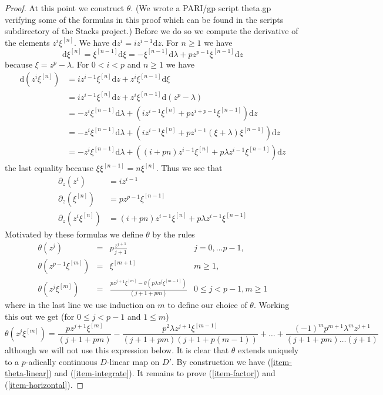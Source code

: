 \documentclass{amsart}
\theoremstyle{plain}
\theoremstyle{definition}
\theoremstyle{remark}
\numberwithin{equation}{subsection}
\begin{document}
\begin{proof}
\medskip\noindent
At this point we construct $\theta$. (We wrote a PARI/gp script theta.gp
verifying some of the formulas in this proof which can be found in the
scripts subdirectory of the Stacks project.) Before we do so we compute
the derivative of the elements $z^i \xi^{[n]}$. We have
$\text{d}z^i = i z^{i - 1} \text{d}z$. For $n \geq 1$ we have
$$
\text{d}\xi^{[n]} =
\xi^{[n - 1]} \text{d}\xi =
- \xi^{[n - 1]}\text{d}\lambda + p z^{p - 1} \xi^{[n - 1]}\text{d}z
$$
because $\xi = z^p - \lambda$. For $0 < i < p$ and $n \geq 1$ we have
\begin{align*}
\text{d}(z^i\xi^{[n]})
& =
iz^{i - 1}\xi^{[n]}\text{d}z + z^i\xi^{[n - 1]}\text{d}\xi \\
& =
iz^{i - 1}\xi^{[n]}\text{d}z + z^i\xi^{[n - 1]}\text{d}(z^p - \lambda) \\
& =
- z^i\xi^{[n - 1]}\text{d}\lambda +
(iz^{i - 1}\xi^{[n]} + pz^{i + p - 1}\xi^{[n - 1]})\text{d}z \\
& =
- z^i\xi^{[n - 1]}\text{d}\lambda +
(iz^{i - 1}\xi^{[n]} + pz^{i - 1}(\xi + \lambda)\xi^{[n - 1]})\text{d}z \\
& =
- z^i\xi^{[n - 1]}\text{d}\lambda +
((i + pn)z^{i - 1}\xi^{[n]} + p\lambda z^{i - 1}\xi^{[n - 1]})\text{d}z
\end{align*}
the last equality because $\xi \xi^{[n - 1]} = n\xi^{[n]}$.
Thus we see that
\begin{align*}
\partial_z(z^i) & = i z^{i - 1} \\
\partial_z(\xi^{[n]}) & = p z^{p - 1} \xi^{[n - 1]} \\
\partial_z(z^i\xi^{[n]}) & =
(i + pn) z^{i - 1} \xi^{[n]} + p \lambda z^{i - 1}\xi^{[n - 1]}
\end{align*}
Motivated by these formulas we define $\theta$ by the rules
$$
\begin{matrix}
\theta(z^j)
& = & p\frac{z^{j + 1}}{j + 1}
& j = 0, \ldots p - 1, \\
\theta(z^{p - 1}\xi^{[m]})
& = & \xi^{[m + 1]}
& m \geq 1, \\
\theta(z^j \xi^{[m]})
& = &
\frac{p z^{j + 1} \xi^{[m]} - \theta(p\lambda z^j \xi^{[m - 1]})}{(j + 1 + pm)}
& 0 \leq j < p - 1, m \geq 1
\end{matrix}
$$
where in the last line we use induction on $m$ to define our choice of
$\theta$. Working this out we get (for $0 \leq j < p - 1$ and $1 \leq m$)
$$
\theta(z^j \xi^{[m]}) =
\textstyle{\frac{p z^{j + 1} \xi^{[m]}}{(j + 1 + pm)} -
\frac{p^2 \lambda z^{j + 1} \xi^{[m - 1]}}{(j + 1 + pm)(j + 1 + p(m - 1))} +
\ldots +
\frac{(-1)^m p^{m + 1} \lambda^m z^{j + 1}}
{(j + 1 + pm) \ldots (j + 1)}}
$$
although we will not use this expression below. It is clear that $\theta$
extends uniquely to a $p$-adically continuous $D$-linear map on $D'$.
By construction we have (\ref{item-theta-linear}) and (\ref{item-integrate}).
It remains to prove (\ref{item-factor}) and (\ref{item-horizontal}).


\end{proof}
\end{document}
